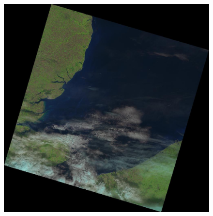 \documentclass{book}
\begin{document}
\begin{figure}[H]
\begin{center}
\includegraphics[scale=0.18]{images/LC82000242013271LGN00.jpg}
\end{center}
\label{cloud1}
\end{figure}
\end{document}
